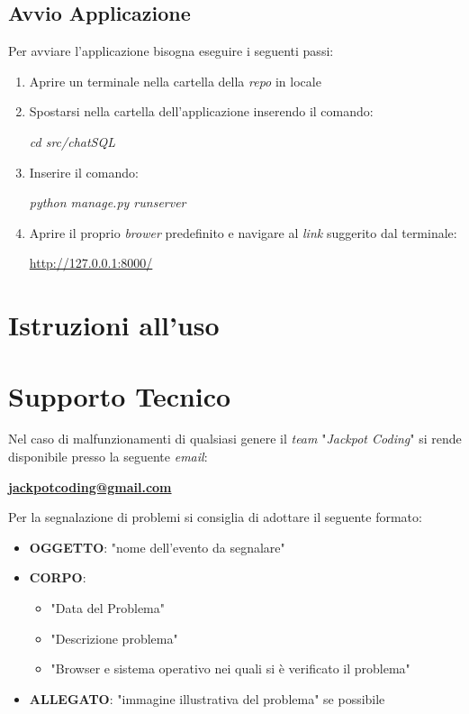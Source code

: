 \documentclass[5pt]{article}
\begin{document}
		\subsection{Avvio Applicazione}
			Per avviare l'applicazione bisogna eseguire i seguenti passi:
			\begin{enumerate}
				\item Aprire un terminale nella cartella della \textit{repo} in locale
				\item Spostarsi nella cartella dell'applicazione inserendo il comando:
					\begin{center}
						\textit{cd src/chatSQL}
					\end{center}
				\item Inserire il comando:
					\begin{center}
						\textit{python manage.py runserver}
					\end{center}
				\item Aprire il proprio \textit{brower} predefinito e navigare al \textit{link} suggerito dal terminale:
					\begin{center}
						\url{http://127.0.0.1:8000/}
					\end{center}
			\end{enumerate}
 
    \section{Istruzioni all'uso}
        
	\section{Supporto Tecnico}
		Nel caso di malfunzionamenti di qualsiasi genere il \textit{team} "\textit{Jackpot Coding}" si rende disponibile presso la seguente \textit{email}:
		\begin{center}
			\textbf{\url{jackpotcoding@gmail.com}}
		\end{center}

		Per la segnalazione di problemi si consiglia di adottare il seguente formato:
		\begin{itemize}
			\item \textbf{OGGETTO}: "nome dell'evento da segnalare"
			\item \textbf{CORPO}:
			\begin{itemize}
				\item "Data del Problema"
				\item "Descrizione problema"
				\item "Browser e sistema operativo nei quali si è verificato il problema"
			\end{itemize}
			\item \textbf{ALLEGATO}: "immagine illustrativa del problema" se possibile
		\end{itemize}
        
\end{document}
